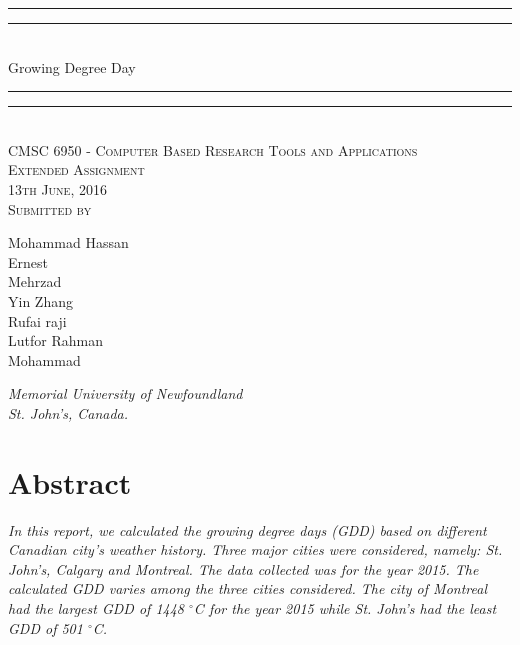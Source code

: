 \documentclass{article}
\begin{document}
{\centering

\rule{\textwidth}{1.6pt}\vspace*{-\baselineskip}\vspace*{2pt} 
\rule{\textwidth}{0.4pt}\\[\baselineskip] 
{\LARGE Growing Degree Day}
\rule{\textwidth}{0.4pt}\vspace*{-\baselineskip}\vspace{3.2pt}
\rule{\textwidth}{1.6pt}\\[\baselineskip] 

\vspace{20mm} %
\scshape %
CMSC 6950 - Computer Based Research Tools and Applications \\ [\baselineskip]
Extended Assignment \\[\baselineskip] 
13th June, 2016 \\[\baselineskip] 
\vspace{20mm} %
Submitted by \\[\baselineskip]
{\Large Mohammad Hassan \\ Ernest \\ Mehrzad \\ Yin Zhang \\ Rufai raji \\ Lutfor Rahman \\ Mohammad\par}
\vfill
{\itshape Memorial University of Newfoundland \\ St. John's, Canada.\par} 
}

\newpage

{\centering
  \section*{Abstract}
}

{\itshape In this report, we calculated the growing degree days (GDD) based on different Canadian city's weather history. Three major cities were considered, namely: St. John’s, Calgary and Montreal. The data collected was for the year 2015. The calculated GDD varies among the three cities considered. The city of Montreal had the largest GDD of 1448 $^{\circ}$C for the year 2015 while St. John's had the least GDD of 501 $^{\circ}$C.\\
}

\end{document}
